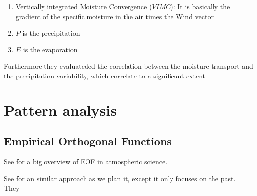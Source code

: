 \begin{enumerate}
  \item Vertically integrated Moisture Convergence ($VIMC$): It is basically the gradient of the specific moisture in the air times the Wind vector
  \item $P$ is the precipitation 
  \item $E$ is the evaporation
\end{enumerate}

Furthermore they evaluateded the correlation between the moisture transport and the precipitation variability, which correlate to a significant extent.

\section{Pattern analysis}

\subsection{Empirical Orthogonal Functions}

See \cite{hannachi2007eof_review} for a big overview of EOF in atmospheric science.

See \cite{Ayantobo2021IntegratedMT} for an similar approach as we plan it, except it only focuses on the past.
They 
